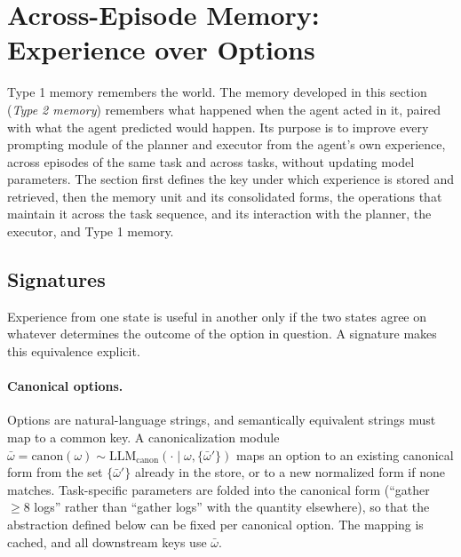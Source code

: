 \documentclass[11pt]{article}
\newcommand{\llm}[1]{\mathrm{LLM}_{\mathrm{#1}}}
\begin{document}
\section{Across-Episode Memory: Experience over Options}
\label{sec:type2}

Type 1 memory remembers the world. The memory developed in this section (\emph{Type 2 memory}) remembers what happened when the agent acted in it, paired with what the agent predicted would happen. Its purpose is to improve every prompting module of the planner and executor from the agent's own experience, across episodes of the same task and across tasks, without updating model parameters. The section first defines the key under which experience is stored and retrieved, then the memory unit and its consolidated forms, the operations that maintain it across the task sequence, and its interaction with the planner, the executor, and Type 1 memory.

\subsection{Signatures}
\label{sec:signature}

Experience from one state is useful in another only if the two states agree on whatever determines the outcome of the option in question. A signature makes this equivalence explicit.

\paragraph{Canonical options.}
Options are natural-language strings, and semantically equivalent strings must map to a common key. A canonicalization module $\bar\omega=\mathrm{canon}(\omega)\sim\llm{canon}(\cdot\mid\omega,\{\bar\omega'\})$ maps an option to an existing canonical form from the set $\{\bar\omega'\}$ already in the store, or to a new normalized form if none matches. Task-specific parameters are folded into the canonical form (``gather $\ge 8$ logs'' rather than ``gather logs'' with the quantity elsewhere), so that the abstraction defined below can be fixed per canonical option. The mapping is cached, and all downstream keys use $\bar\omega$.
\end{document}
